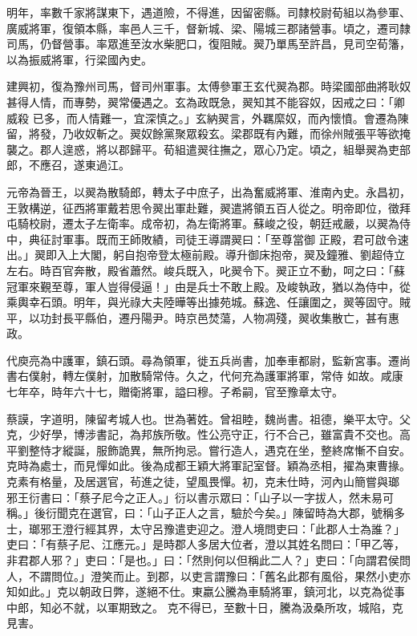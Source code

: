 \begin{pinyinscope}
 明年，率數千家將謀東下，遇道險，不得進，因留密縣。司隸校尉荀組以為參軍、廣威將軍，復領本縣，率邑人三千，督新城、梁、陽城三郡諸營事。頃之，遷司隸司馬，仍督營事。率眾進至汝水柴肥口，復阻賊。翜乃單馬至許昌，見司空荀籓，以為振威將軍，行梁國內史。



 建興初，復為豫州司馬，督司州軍事。太傅參軍王玄代翜為郡。時梁國部曲將耿奴甚得人情，而專勢，翜常優遇之。玄為政既急，翜知其不能容奴，因戒之曰：「卿威殺
 已多，而人情難一，宜深慎之。」玄納翜言，外羈縻奴，而內懷憤。會遷為陳留，將發，乃收奴斬之。翜奴餘黨聚眾殺玄。梁郡既有內難，而徐州賊張平等欲掩襲之。郡人遑惑，將以郡歸平。荀組遣翜往撫之，眾心乃定。頃之，組舉翜為吏部郎，不應召，遂東過江。



 元帝為晉王，以翜為散騎郎，轉太子中庶子，出為奮威將軍、淮南內史。永昌初，王敦構逆，征西將軍戴若思令翜出軍赴難，翜遣將領五百人從之。明帝即位，徵拜屯騎校尉，遷太子左衛率。成帝初，為左衛將軍。蘇峻之役，朝廷戒嚴，以翜為侍中，典征討軍事。既而王師敗績，司徒王導謂翜曰：「至尊當御
 正殿，君可啟令速出。」翜即入上大閣，躬自抱帝登太極前殿。導升御床抱帝，翜及鐘雅、劉超侍立左右。時百官奔散，殿省蕭然。峻兵既入，叱翜令下。翜正立不動，呵之曰：「蘇冠軍來覲至尊，軍人豈得侵逼！」由是兵士不敢上殿。及峻執政，猶以為侍中，從乘輿幸石頭。明年，與光祿大夫陸曄等出據苑城。蘇逸、任讓圍之，翜等固守。賊平，以功封長平縣伯，遷丹陽尹。時京邑焚蕩，人物凋殘，翜收集散亡，甚有惠政。



 代庾亮為中護軍，鎮石頭。尋為領軍，徙五兵尚書，加奉車都尉，監新宮事。遷尚書右僕射，轉左僕射，加散騎常侍。久之，代何充為護軍將軍，常侍
 如故。咸康七年卒，時年六十七，贈衛將軍，謚曰穆。子希嗣，官至豫章太守。



 蔡謨，字道明，陳留考城人也。世為著姓。曾祖睦，魏尚書。祖德，樂平太守。父克，少好學，博涉書記，為邦族所敬。性公亮守正，行不合己，雖富貴不交也。高平劉整恃才縱誕，服飾詭異，無所拘忌。嘗行造人，遇克在坐，整終席慚不自安。克時為處士，而見憚如此。後為成都王穎大將軍記室督。穎為丞相，擢為東曹掾。克素有格量，及居選官，茍進之徒，望風畏憚。初，克未仕時，河內山簡嘗與瑯
 邪王衍書曰：「蔡子尼今之正人。」衍以書示眾曰：「山子以一字拔人，然未易可稱。」後衍聞克在選官，曰：「山子正人之言，驗於今矣。」陳留時為大郡，號稱多士，瑯邪王澄行經其界，太守呂豫遣吏迎之。澄人境問吏曰：「此郡人士為誰？」吏曰：「有蔡子尼、江應元。」是時郡人多居大位者，澄以其姓名問曰：「甲乙等，非君郡人邪？」吏曰：「是也。」曰：「然則何以但稱此二人？」吏曰：「向謂君侯問人，不謂問位。」澄笑而止。到郡，以吏言謂豫曰：「舊名此郡有風俗，果然小吏亦知如此。」克以朝政日弊，遂絕不仕。東嬴公騰為車騎將軍，鎮河北，以克為從事中郎，知必不就，以軍期致之。
 克不得已，至數十日，騰為汲桑所攻，城陷，克見害。




\end{pinyinscope}
